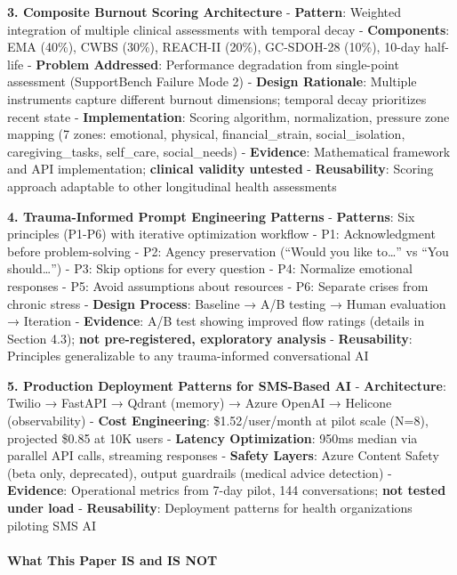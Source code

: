 \documentclass[
]{article}
\begin{document}
\textbf{3. Composite Burnout Scoring Architecture} - \textbf{Pattern}:
Weighted integration of multiple clinical assessments with temporal
decay - \textbf{Components}: EMA (40\%), CWBS (30\%), REACH-II (20\%),
GC-SDOH-28 (10\%), 10-day half-life - \textbf{Problem Addressed}:
Performance degradation from single-point assessment (SupportBench
Failure Mode 2) - \textbf{Design Rationale}: Multiple instruments
capture different burnout dimensions; temporal decay prioritizes recent
state - \textbf{Implementation}: Scoring algorithm, normalization,
pressure zone mapping (7 zones: emotional, physical, financial\_strain,
social\_isolation, caregiving\_tasks, self\_care, social\_needs) -
\textbf{Evidence}: Mathematical framework and API implementation;
\textbf{clinical validity untested} - \textbf{Reusability}: Scoring
approach adaptable to other longitudinal health assessments

\textbf{4. Trauma-Informed Prompt Engineering Patterns} -
\textbf{Patterns}: Six principles (P1-P6) with iterative optimization
workflow - P1: Acknowledgment before problem-solving - P2: Agency
preservation (``Would you like to\ldots{}'' vs ``You should\ldots{}'') -
P3: Skip options for every question - P4: Normalize emotional responses
- P5: Avoid assumptions about resources - P6: Separate crises from
chronic stress - \textbf{Design Process}: Baseline → A/B testing → Human
evaluation → Iteration - \textbf{Evidence}: A/B test showing improved
flow ratings (details in Section 4.3); \textbf{not pre-registered,
exploratory analysis} - \textbf{Reusability}: Principles generalizable
to any trauma-informed conversational AI

\textbf{5. Production Deployment Patterns for SMS-Based AI} -
\textbf{Architecture}: Twilio → FastAPI → Qdrant (memory) → Azure OpenAI
→ Helicone (observability) - \textbf{Cost Engineering}:
\$1.52/user/month at pilot scale (N=8), projected \$0.85 at 10K users -
\textbf{Latency Optimization}: 950ms median via parallel API calls,
streaming responses - \textbf{Safety Layers}: Azure Content Safety (beta
only, deprecated), output guardrails (medical advice detection) -
\textbf{Evidence}: Operational metrics from 7-day pilot, 144
conversations; \textbf{not tested under load} - \textbf{Reusability}:
Deployment patterns for health organizations piloting SMS AI

\paragraph{What This Paper IS and IS
NOT}\label{what-this-paper-is-and-is-not}
\end{document}

